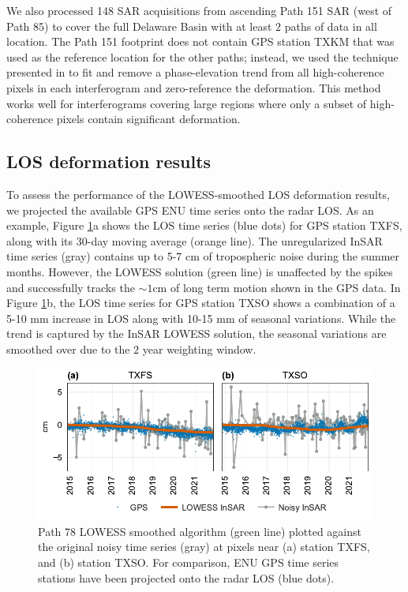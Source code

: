We also processed 148 SAR acquisitions from ascending Path 151 SAR (west of Path 85) to cover the full Delaware Basin with at least $2$ paths of data in all location.
The Path 151 footprint does not contain GPS station TXKM that was used as the reference location for the other paths;
instead, we used the technique presented in \cite{Zebker2021AccuracyModelFree} to fit and remove a phase-elevation trend from all high-coherence pixels in each interferogram and zero-reference the deformation. This method works well for interferograms covering large regions where only a subset of high-coherence pixels contain significant deformation.


\subsection{LOS deformation results}
\label{sec:ch5-results-path78}


To assess the performance of the LOWESS-smoothed LOS deformation results, we projected the available GPS ENU time series onto the radar LOS. 
As an example, Figure \ref{fig:ch5-results-gps-example}a shows the LOS time series (blue dots) for GPS station TXFS, along with its 30-day moving average (orange line).
The unregularized InSAR time series (gray) contains up to 5-7 cm of tropospheric noise during the summer months. However, the LOWESS solution (green line) is unaffected by the spikes and successfully tracks the $ \sim1 $cm of long term motion shown in the GPS data. 
In Figure \ref{fig:ch5-results-gps-example}b, the LOS time series for GPS station TXSO shows a combination of a 5-10 mm increase in LOS along with 10-15 mm of seasonal variations.
While the trend is captured by the InSAR LOWESS solution, the seasonal variations are smoothed over due to the $2$ year weighting window.



\begin{figure}
	\centering
	\includegraphics[width=.99\textwidth]{figures/chapter5-lowess/gps_path78_2plots.pdf}
	\caption[Example results for Path 78 LOWESS smoothing]{
		Path 78 LOWESS smoothed algorithm (green line) plotted against the original noisy time series (gray) at pixels near (a) station TXFS, and (b) station TXSO.
		For comparison, ENU GPS time series stations have been projected onto the radar LOS (blue dots). 
	}
	\label{fig:ch5-results-gps-example}
\end{figure}


